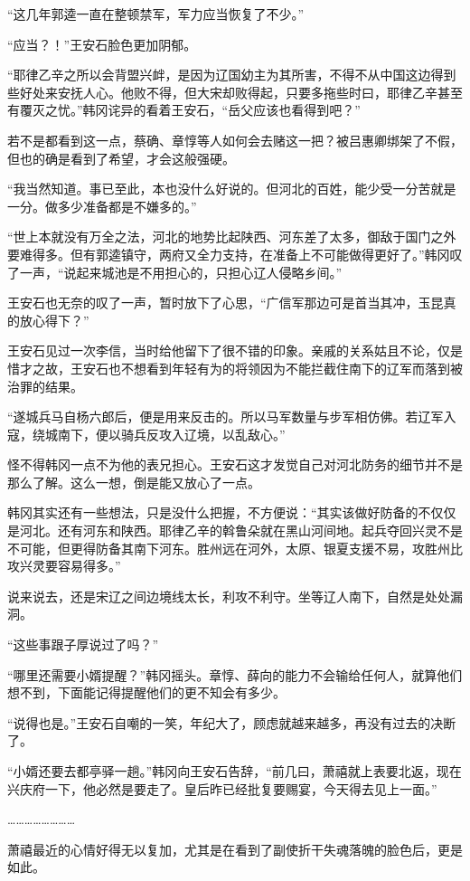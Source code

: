 “这几年郭逵一直在整顿禁军，军力应当恢复了不少。”

“应当？！”王安石脸色更加阴郁。

“耶律乙辛之所以会背盟兴衅，是因为辽国幼主为其所害，不得不从中国这边得到些好处来安抚人心。他败不得，但大宋却败得起，只要多拖些时曰，耶律乙辛甚至有覆灭之忧。”韩冈诧异的看着王安石，“岳父应该也看得到吧？”

若不是都看到这一点，蔡确、章惇等人如何会去赌这一把？被吕惠卿绑架了不假，但也的确是看到了希望，才会这般强硬。

“我当然知道。事已至此，本也没什么好说的。但河北的百姓，能少受一分苦就是一分。做多少准备都是不嫌多的。”

“世上本就没有万全之法，河北的地势比起陕西、河东差了太多，御敌于国门之外要难得多。但有郭逵镇守，两府又全力支持，在准备上不可能做得更好了。”韩冈叹了一声，“说起来城池是不用担心的，只担心辽人侵略乡间。”

王安石也无奈的叹了一声，暂时放下了心思，“广信军那边可是首当其冲，玉昆真的放心得下？”

王安石见过一次李信，当时给他留下了很不错的印象。亲戚的关系姑且不论，仅是惜才之故，王安石也不想看到年轻有为的将领因为不能拦截住南下的辽军而落到被治罪的结果。

“遂城兵马自杨六郎后，便是用来反击的。所以马军数量与步军相仿佛。若辽军入寇，绕城南下，便以骑兵反攻入辽境，以乱敌心。”

怪不得韩冈一点不为他的表兄担心。王安石这才发觉自己对河北防务的细节并不是那么了解。这么一想，倒是能又放心了一点。

韩冈其实还有一些想法，只是没什么把握，不方便说：“其实该做好防备的不仅仅是河北。还有河东和陕西。耶律乙辛的斡鲁朵就在黑山河间地。起兵夺回兴灵不是不可能，但更得防备其南下河东。胜州远在河外，太原、银夏支援不易，攻胜州比攻兴灵要容易得多。”

说来说去，还是宋辽之间边境线太长，利攻不利守。坐等辽人南下，自然是处处漏洞。

“这些事跟子厚说过了吗？”

“哪里还需要小婿提醒？”韩冈摇头。章惇、薛向的能力不会输给任何人，就算他们想不到，下面能记得提醒他们的更不知会有多少。

“说得也是。”王安石自嘲的一笑，年纪大了，顾虑就越来越多，再没有过去的决断了。

“小婿还要去都亭驿一趟。”韩冈向王安石告辞，“前几曰，萧禧就上表要北返，现在兴庆府一下，他必然是要走了。皇后昨已经批复要赐宴，今天得去见上一面。”

……………………

萧禧最近的心情好得无以复加，尤其是在看到了副使折干失魂落魄的脸色后，更是如此。


